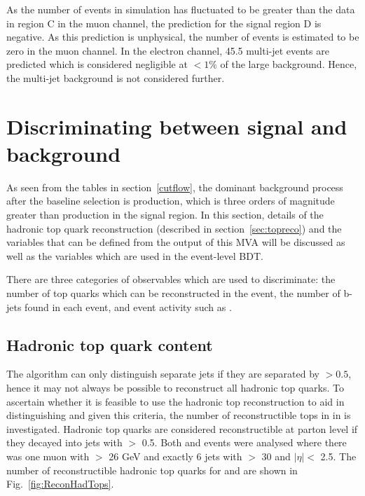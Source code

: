As the number of \ttbar events in simulation has fluctuated to be greater than the data in region C in the muon channel, the prediction for the signal region D is negative. As this prediction is unphysical, the number of events is estimated to be zero in the muon channel. In the electron channel, 45.5 multi-jet events are predicted which is considered negligible at $<1\%$ of the large \ttbar background. Hence, the multi-jet background is not considered further.

\section{Discriminating between signal and background}
\label{sec:discriminating}
As seen from the tables in section~\ref{cutflow}, the dominant background process after the baseline selection is \ttbar production, which is three orders of magnitude greater than \tttt production in the signal region.
In this section, details of the hadronic top quark reconstruction (described in section~\ref{sec:topreco}) and the variables that can be defined from the output of this MVA will be discussed as well as the variables which are used in the event-level BDT.

There are three categories of observables which are used to discriminate: the number of top quarks which can be reconstructed in the event, the number of b-jets found in each event, and event activity such as \HT.

\subsection{Hadronic top quark content}
\label{sec:topContent}

The \antikt algorithm can only distinguish separate jets if they are separated by \DR$>0.5$, hence it may not always be possible to reconstruct all hadronic top quarks. To ascertain whether it is feasible to use the hadronic top reconstruction to aid in distinguishing \tttt and \ttbar given this criteria, the number of reconstructible tops in \tttt in \ttbar is investigated. Hadronic top quarks are considered reconstructible at parton level if they decayed into jets with \DR  $>$  0.5. Both \tttt and \ttbar events were analysed where there was one muon with \PT $>$ 26 GeV and exactly 6 jets with \PT $>$ 30 and $\lvert \eta \rvert<$ 2.5.  The number of reconstructible hadronic top quarks for \tttt and \ttbar are shown in Fig.~\ref{fig:ReconHadTops}.

